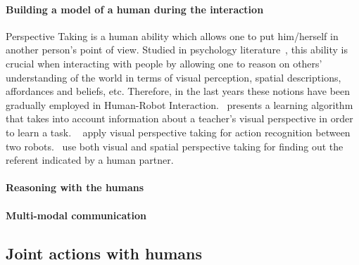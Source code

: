 \documentclass[preprint,5p]{elsarticle}
\begin{document}
\paragraph{Building a model of a human during the interaction} Perspective
Taking is a human ability which allows one to put him/herself in another
person's point of view. Studied in psychology
literature~\cite{Flavell1992,Tversky1999}, this ability is crucial when
interacting with people by allowing one to reason on others' understanding of
the world in terms of visual perception, spatial descriptions, affordances and
beliefs, etc.  Therefore, in the last years these notions have been gradually
employed in Human-Robot Interaction.~\cite{Breazeal2006} presents a learning
algorithm that takes into account information about a teacher's visual
perspective in order to learn a task. ~\cite{Johnson2005} apply visual
perspective taking for action recognition between two
robots.~\cite{Trafton2005} use both visual and spatial perspective taking for
finding out the referent indicated by a human partner.


\paragraph{Reasoning with the humans}


\paragraph{Multi-modal communication}

\subsection{Joint actions with humans}
\label{sec:soa}
\end{document}
